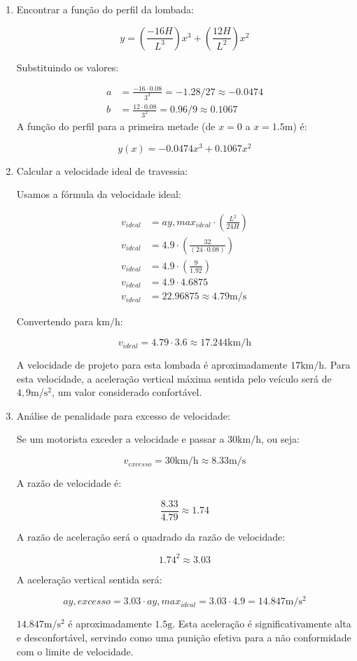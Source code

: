 \documentclass[../resumo.tex]{subfiles}
\begin{document}
\begin{enumerate}
	\item Encontrar a função do perfil da lombada:

		\[ y = (\frac{-16H}{L^3})x^3 + (\frac{12H}{L^2})x^2 \]

		Substituindo os valores:

		\begin{align*}
			a &= \frac{-16\cdot0.08}{3^3} = -1.28/27 \approx -0.0474 \\
			b &= \frac{12\cdot0.08}{3^2} = 0.96/9 \approx 0.1067
		\end{align*}
		A função do perfil para a primeira metade (de $x = 0$ a $x = 1.5 \mathrm{m}$) é:

		\[ y(x) = -0.0474x^3 + 0.1067x^2 \]

	\item Calcular a velocidade ideal de travessia:

		Usamos a fórmula da velocidade ideal:

		\begin{align*}
			v_{ideal} &= ay,max_{ideal}\cdot(\frac{L^2}{24H}) \\
			v_{ideal} &= 4.9\cdot(\frac{32}{(24\cdot0.08)}) \\
			v_{ideal} &= 4.9\cdot(\frac{9}{1.92}) \\
			v_{ideal} &= 4.9\cdot4.6875 \\
			v_{ideal} &= 22.96875 \approx 4.79 \mathrm{m/s}
		\end{align*}

		Convertendo para $\mathrm{km/h}$:

		\[ v_{ideal} = 4.79\cdot3.6 \approx 17.244 \mathrm{km/h} \]

		A velocidade de projeto para esta lombada é aproximadamente $17 \mathrm{km/h}$. Para esta velocidade, a
		aceleração vertical máxima sentida pelo veículo será de $4,9 \mathrm{m/s^2}$, um valor considerado confortável.

	\item Análise de penalidade para excesso de velocidade:

		Se um motorista exceder a velocidade e passar a $30 \mathrm{km/h}$, ou seja:

		\[ v_{excesso} = 30 \mathrm{km/h} \approx 8.33 \mathrm{m/s} \]

		A razão de velocidade é:

		\[ \frac{8.33}{4.79} \approx 1.74 \]

		A razão de aceleração será o quadrado da razão de velocidade:

		\[ 1.74^2 \approx 3.03 \]

		A aceleração vertical sentida será:

		\[ ay,excesso = 3.03 \cdot ay, max_{ideal} = 3.03 \cdot 4.9 = 14.847 \mathrm{m/s^2} \]

		$14.847 \mathrm{m/s^2}$ é aproximadamente $1.5 \mathrm{g}$. Esta aceleração é significativamente
		alta e desconfortável, servindo como uma punição efetiva para a não conformidade com o limite de velocidade.
\end{enumerate}
\end{document}

